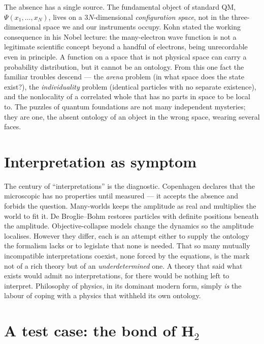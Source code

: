 The absence has a single source. The fundamental object of standard QM, $\Psi(x_1,\dots,x_N)$, lives on a
$3N$-dimensional \emph{configuration space}, not in the three-dimensional space we and our instruments occupy.
Kohn stated the working consequence in his Nobel lecture: the many-electron wave function is not a legitimate
scientific concept beyond a handful of electrons, being unrecordable even in principle. A function on a space
that is not physical space can carry a probability distribution, but it cannot be an ontology. From this one fact
the familiar troubles descend --- the \emph{arena} problem (in what space does the state exist?), the
\emph{individuality} problem (identical particles with no separate existence), and the nonlocality of a
correlated whole that has no parts in space to be local to. The puzzles of quantum foundations are not many
independent mysteries; they are one, the absent ontology of an object in the wrong space, wearing several faces.

\section{Interpretation as symptom}\label{sec:interpretation}

The century of ``interpretations'' is the diagnostic. Copenhagen declares that the microscopic has no properties
until measured --- it accepts the absence and forbids the question. Many-worlds keeps the amplitude as real and
multiplies the world to fit it. De Broglie--Bohm restores particles with definite positions beneath the
amplitude. Objective-collapse models change the dynamics so the amplitude localises. However they differ, each is
an attempt either to supply the ontology the formalism lacks or to legislate that none is needed. That so many
mutually incompatible interpretations coexist, none forced by the equations, is the mark not of a rich theory but
of an \emph{underdetermined} one. A theory that said what exists would admit no interpretations, for there would
be nothing left to interpret. Philosophy of physics, in its dominant modern form, simply \emph{is} the labour of
coping with a physics that withheld its own ontology.

\section{A test case: the bond of H$_2$}\label{sec:h2-test-case}

